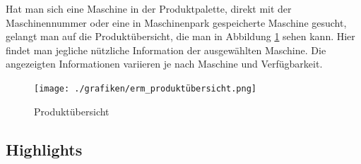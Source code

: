Hat man sich eine Maschine in der Produktpalette, direkt mit der Maschinennummer oder eine in Maschinenpark gespeicherte Maschine gesucht, gelangt man auf die Produktübersicht, die man in Abbildung \ref{fig:produktübersicht} sehen kann. Hier findet man jegliche nützliche Information der ausgewählten Maschine. Die angezeigten Informationen variieren je nach Maschine und Verfügbarkeit.

\begin{figure}[H]
	\centerline{
		\texttt{[image: ./grafiken/erm\_produktübersicht.png]}
	}
	\vskip0pt
	\caption{Produktübersicht} \label{fig:produktübersicht}
\end{figure}

\subsection{Highlights}

